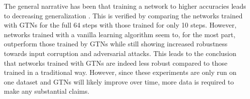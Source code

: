 \documentclass[10pt]{article}
\begin{document}
The general narrative has been that training a network to higher accuracies
leads to decreasing generalization \citep{zhang2019theoretically}. This is verified by comparing
the networks trained with GTNs for the full 64 steps with those 
trained for only 10 steps.
However, networks trained with a vanilla learning algorithm
seem to, for the most part, outperform those trained by GTNs
while still showing increased robustness towards input corruption and 
adversarial attacks.
This leads to the conclusion that networks trained with GTNs 
are indeed less robust compared to those trained in a traditional way.
However, since these experiments are only run on one dataset and GTNs will likely improve over time, more data is required to make any substantial claims.

\appendix

\printbibliography
\end{document}

